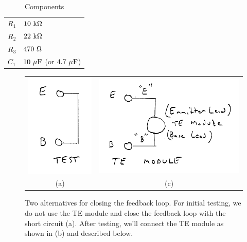 \documentclass[12pt]{article}
\begin{document}
\begin{table}[htb]
\begin{center}
\caption{\label{tbl:bom} Components} 
\vskip 1cm
\begin{tabular}{ll}
$R_1$ & $10~{\rm k\Omega}$ \\
$R_2$ & $22~{\rm k\Omega}$ \\
$R_3$ & $470~{\rm \Omega}$ \\
$C_1$  & $10~{\rm \mu F}$ (or $4.7~{\rm \mu F}$) \\ 
\end{tabular}
\end{center}
\end{table}

\begin{figure}[htb]
\begin{center}
\begin{tabular}{cc}
{\includegraphics[height=0.30\textheight]{figs/test.png}} & 
{\includegraphics[height=0.30\textheight]{figs/te.png}} \\
(a) & (c) \\
\end{tabular}
\end{center}
\caption{\label{fig:feedback} Two alternatives for closing the feedback loop.  For initial testing, we do not use the TE module and close the feedback loop with the short circuit (a).  After testing, we'll connect the TE module as shown in (b) and described below.}
\end{figure}
\end{document}
